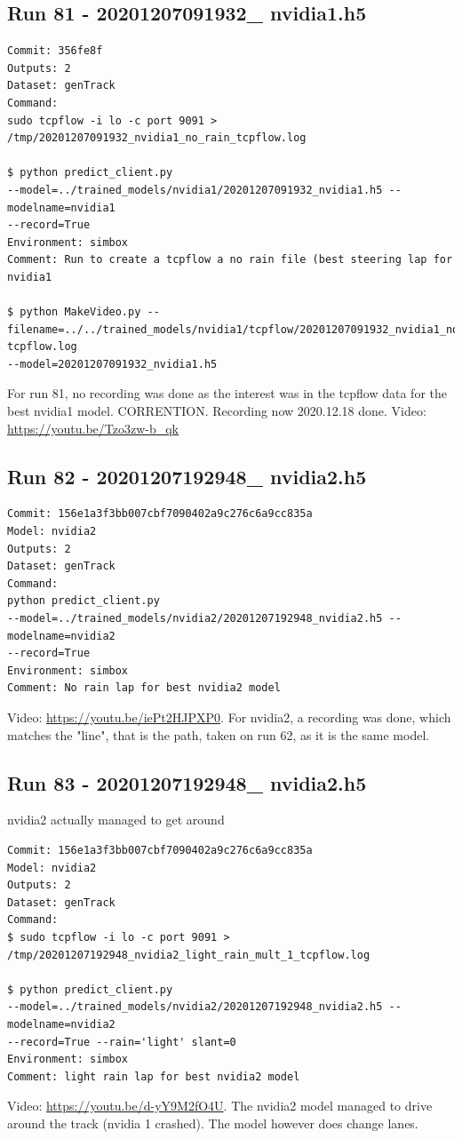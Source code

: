 \subsection{Run 81 - 20201207091932\_ nvidia1.h5}
\label{app_res:81}
\begin{verbatim}
Commit: 356fe8f 
Outputs: 2
Dataset: genTrack
Command:
sudo tcpflow -i lo -c port 9091 > /tmp/20201207091932_nvidia1_no_rain_tcpflow.log

$ python predict_client.py
--model=../trained_models/nvidia1/20201207091932_nvidia1.h5 --modelname=nvidia1 
--record=True
Environment: simbox
Comment: Run to create a tcpflow a no rain file (best steering lap for nvidia1

$ python MakeVideo.py --filename=../../trained_models/nvidia1/tcpflow/20201207091932_nvidia1_no_rain_
tcpflow.log 
--model=20201207091932_nvidia1.h5

\end{verbatim}
For run 81, no recording was done as the interest was in the tcpflow data for the best nvidia1 model. CORRENTION. Recording now 2020.12.18 done.
Video: \url{https://youtu.be/Tzo3zw-b_qk}
\subsection{Run 82 - 20201207192948\_ nvidia2.h5 }
\label{app_res:82}
\begin{verbatim}
Commit: 156e1a3f3bb007cbf7090402a9c276c6a9cc835a
Model: nvidia2 
Outputs: 2
Dataset: genTrack
Command:
python predict_client.py
--model=../trained_models/nvidia2/20201207192948_nvidia2.h5 --modelname=nvidia2 
--record=True
Environment: simbox
Comment: No rain lap for best nvidia2 model

\end{verbatim}
Video: \url{https://youtu.be/iePt2HJPXP0}. 
For nvidia2, a recording was done, which matches the "line", that is the path, taken on run 62, as it is the same model.

\subsection{Run 83 - 20201207192948\_ nvidia2.h5 }
nvidia2 actually managed to get around
\label{app_res:83}
\begin{verbatim}
Commit: 156e1a3f3bb007cbf7090402a9c276c6a9cc835a
Model: nvidia2 
Outputs: 2
Dataset: genTrack
Command:
$ sudo tcpflow -i lo -c port 9091 > 
/tmp/20201207192948_nvidia2_light_rain_mult_1_tcpflow.log

$ python predict_client.py
--model=../trained_models/nvidia2/20201207192948_nvidia2.h5 --modelname=nvidia2 
--record=True --rain='light' slant=0
Environment: simbox
Comment: light rain lap for best nvidia2 model
\end{verbatim}
Video: \url{https://youtu.be/d-yY9M2fO4U}. The nvidia2 model managed to drive around the track (nvidia 1 crashed). The model however does change lanes.

